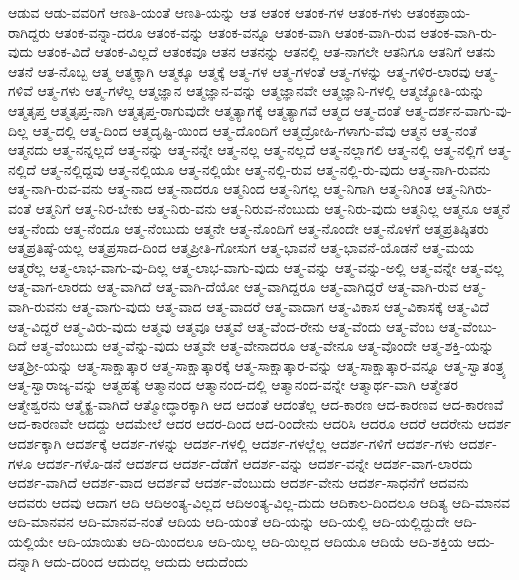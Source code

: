 {ಆಡುವ
ಆಡು-ವವರಿಗೆ
ಆಣತಿ-ಯಂತೆ
ಆಣತಿ-ಯನ್ನು
ಆತ
ಆತಂಕ
ಆತಂಕ-ಗಳ
ಆತಂಕ-ಗಳು
ಆತಂಕಪ್ರಾಯ-ರಾಗಿದ್ದರು
ಆತಂಕ-ವನ್ನಾ-ದರೂ
ಆತಂಕ-ವನ್ನು
ಆತಂಕ-ವನ್ನೂ
ಆತಂಕ-ವಾಗಿ
ಆತಂಕ-ವಾಗಿ-ರುವ
ಆತಂಕ-ವಾಗಿ-ರು-ವುದು
ಆತಂಕ-ವಿದೆ
ಆತಂಕ-ವಿಲ್ಲದೆ
ಆತಂಕವೂ
ಆತನ
ಆತನನ್ನು
ಆತನಲ್ಲಿ
ಆತ-ನಾಗಲೇ
ಆತನಿಗೂ
ಆತನಿಗೆ
ಆತನು
ಆತನೆ
ಆತ-ನೊಬ್ಬ
ಆತ್ಮ
ಆತ್ಮಕ್ಕಾಗಿ
ಆತ್ಮಕ್ಕೂ
ಆತ್ಮಕ್ಕೆ
ಆತ್ಮ-ಗಳ
ಆತ್ಮ-ಗಳಂತೆ
ಆತ್ಮ-ಗಳನ್ನು
ಆತ್ಮ-ಗಳಿರ-ಲಾರವು
ಆತ್ಮ-ಗಳಿವೆ
ಆತ್ಮ-ಗಳು
ಆತ್ಮ-ಗಳೆಲ್ಲ
ಆತ್ಮಜ್ಞಾನ
ಆತ್ಮಜ್ಞಾನ-ವನ್ನು
ಆತ್ಮಜ್ಞಾನವೇ
ಆತ್ಮಜ್ಞಾನಿ-ಗಳಲ್ಲಿ
ಆತ್ಮಜ್ಯೋತಿ-ಯನ್ನು
ಆತ್ಮತೃಪ್ತ
ಆತ್ಮತೃಪ್ತ-ನಾಗಿ
ಆತ್ಮತೃಪ್ತ-ರಾಗುವುದೇ
ಆತ್ಮತ್ಯಾಗಕ್ಕೆ
ಆತ್ಮತ್ಯಾಗವೆ
ಆತ್ಮದ
ಆತ್ಮ-ದಂತೆ
ಆತ್ಮ-ದರ್ಶನ-ವಾಗು-ವು-ದಿಲ್ಲ
ಆತ್ಮ-ದಲ್ಲಿ
ಆತ್ಮ-ದಿಂದ
ಆತ್ಮದೃಷ್ಟಿ-ಯಿಂದ
ಆತ್ಮ-ದೊಂದಿಗೆ
ಆತ್ಮದ್ರೋಹಿ-ಗಳಾಗು-ವೆವು
ಆತ್ಮನ
ಆತ್ಮ-ನಂತೆ
ಆತ್ಮನದು
ಆತ್ಮ-ನನ್ನಲ್ಲದೆ
ಆತ್ಮ-ನನ್ನು
ಆತ್ಮ-ನನ್ನೇ
ಆತ್ಮ-ನಲ್ಲ
ಆತ್ಮ-ನಲ್ಲದೆ
ಆತ್ಮ-ನಲ್ಲಾಗಲಿ
ಆತ್ಮ-ನಲ್ಲಿ
ಆತ್ಮ-ನಲ್ಲಿಗೆ
ಆತ್ಮ-ನಲ್ಲಿದೆ
ಆತ್ಮ-ನಲ್ಲಿದ್ದವು
ಆತ್ಮ-ನಲ್ಲಿಯೂ
ಆತ್ಮ-ನಲ್ಲಿಯೇ
ಆತ್ಮ-ನಲ್ಲಿ-ರುವ
ಆತ್ಮ-ನಲ್ಲಿ-ರು-ವುದು
ಆತ್ಮ-ನಾಗಿ-ರುವನು
ಆತ್ಮ-ನಾಗಿ-ರುವ-ವನು
ಆತ್ಮ-ನಾದ
ಆತ್ಮ-ನಾದರೂ
ಆತ್ಮನಿಂದ
ಆತ್ಮ-ನಿಗಲ್ಲ
ಆತ್ಮ-ನಿಗಾಗಿ
ಆತ್ಮ-ನಿಗಿಂತ
ಆತ್ಮ-ನಿಗಿರು-ವಂತೆ
ಆತ್ಮನಿಗೆ
ಆತ್ಮ-ನಿರ-ಬೇಕು
ಆತ್ಮ-ನಿರು-ವನು
ಆತ್ಮ-ನಿರುವ-ನೆಂಬುದು
ಆತ್ಮ-ನಿರು-ವುದು
ಆತ್ಮನಿಲ್ಲ
ಆತ್ಮನೂ
ಆತ್ಮನೆ
ಆತ್ಮ-ನೆಂದು
ಆತ್ಮ-ನೆಂದೂ
ಆತ್ಮ-ನೆಂಬುದು
ಆತ್ಮನೇ
ಆತ್ಮ-ನೊಂದಿಗೆ
ಆತ್ಮ-ನೊಂದೇ
ಆತ್ಮ-ನೊಳಗೆ
ಆತ್ಮಪ್ರತಿಷ್ಠಿತರು
ಆತ್ಮಪ್ರತಿಷ್ಠೆ-ಯಲ್ಲ
ಆತ್ಮಪ್ರಸಾದ-ದಿಂದ
ಆತ್ಮಪ್ರೀತಿ-ಗೋಸುಗ
ಆತ್ಮ-ಭಾವನೆ
ಆತ್ಮ-ಭಾವನೆ-ಯೊಡನೆ
ಆತ್ಮ-ಮಯ
ಆತ್ಮರೆಲ್ಲ
ಆತ್ಮ-ಲಾಭ-ವಾಗು-ವು-ದಿಲ್ಲ
ಆತ್ಮ-ಲಾಭ-ವಾಗು-ವುದು
ಆತ್ಮ-ವನ್ನು
ಆತ್ಮ-ವನ್ನು-ಅಲ್ಲಿ
ಆತ್ಮ-ವನ್ನೇ
ಆತ್ಮ-ವಲ್ಲ
ಆತ್ಮ-ವಾಗ-ಲಾರದು
ಆತ್ಮ-ವಾಗಿದೆ
ಆತ್ಮ-ವಾಗಿ-ದೆಯೋ
ಆತ್ಮ-ವಾಗಿದ್ದರೂ
ಆತ್ಮ-ವಾಗಿದ್ದರೆ
ಆತ್ಮ-ವಾಗಿ-ರುವ
ಆತ್ಮ-ವಾಗಿ-ರುವನು
ಆತ್ಮ-ವಾಗು-ವುದು
ಆತ್ಮ-ವಾದ
ಆತ್ಮ-ವಾದರೆ
ಆತ್ಮ-ವಾದಾಗ
ಆತ್ಮ-ವಿಕಾಸ
ಆತ್ಮ-ವಿಕಾಸಕ್ಕೆ
ಆತ್ಮ-ವಿದೆ
ಆತ್ಮ-ವಿದ್ದರೆ
ಆತ್ಮ-ವಿರು-ವುದು
ಆತ್ಮವು
ಆತ್ಮವೂ
ಆತ್ಮವೆ
ಆತ್ಮ-ವೆಂದ-ರೇನು
ಆತ್ಮ-ವೆಂದು
ಆತ್ಮ-ವೆಂಬ
ಆತ್ಮ-ವೆಂಬು-ದಿದೆ
ಆತ್ಮ-ವೆಂಬುದು
ಆತ್ಮ-ವೆನ್ನು-ವುದು
ಆತ್ಮವೇ
ಆತ್ಮ-ವೇನಾದರೂ
ಆತ್ಮ-ವೇನೂ
ಆತ್ಮ-ವೊಂದೇ
ಆತ್ಮ-ಶಕ್ತಿ-ಯನ್ನು
ಆತ್ಮಶ್ರೀ-ಯನ್ನು
ಆತ್ಮ-ಸಾಕ್ಷಾತ್ಕಾರ
ಆತ್ಮ-ಸಾಕ್ಷಾತ್ಕಾರಕ್ಕೆ
ಆತ್ಮ-ಸಾಕ್ಷಾತ್ಕಾರ-ವನ್ನು
ಆತ್ಮ-ಸಾಕ್ಷಾತ್ಕಾರ-ವನ್ನೂ
ಆತ್ಮ-ಸ್ವಾತಂತ್ರ್ಯ
ಆತ್ಮ-ಸ್ವಾರಾಜ್ಯ-ವನ್ನು
ಆತ್ಮಹತ್ಯೆ
ಆತ್ಮಾನಂದ
ಆತ್ಮಾನಂದ-ದಲ್ಲಿ
ಆತ್ಮಾನಂದ-ವನ್ನೇ
ಆತ್ಮಾರ್ಥ-ವಾಗಿ
ಆತ್ಮೇತರ
ಆತ್ಮೇಶ್ವರನು
ಆತ್ಮೈಕ್ಯ-ವಾಗಿದೆ
ಆತ್ಮೋದ್ಧಾರಕ್ಕಾಗಿ
ಆದ
ಆದಂತೆ
ಆದಂತೆಲ್ಲ
ಆದ-ಕಾರಣ
ಆದ-ಕಾರಣವ
ಆದ-ಕಾರಣವೆ
ಆದ-ಕಾರಣವೇ
ಆದದ್ದು
ಆದಮೇಲೆ
ಆದರ
ಆದರ-ದಿಂದ
ಆದ-ರಿಂದೇನು
ಆದರಿಸಿ
ಆದರೂ
ಆದರೆ
ಆದರೇನು
ಆದರ್ಶ
ಆದರ್ಶಕ್ಕಾಗಿ
ಆದರ್ಶಕ್ಕೆ
ಆದರ್ಶ-ಗಳನ್ನು
ಆದರ್ಶ-ಗಳಲ್ಲಿ
ಆದರ್ಶ-ಗಳಲ್ಲೆಲ್ಲ
ಆದರ್ಶ-ಗಳಿಗೆ
ಆದರ್ಶ-ಗಳು
ಆದರ್ಶ-ಗಳೂ
ಆದರ್ಶ-ಗಳೊ-ಡನೆ
ಆದರ್ಶದ
ಆದರ್ಶ-ದೆಡೆಗೆ
ಆದರ್ಶ-ವನ್ನು
ಆದರ್ಶ-ವನ್ನೇ
ಆದರ್ಶ-ವಾಗ-ಲಾರದು
ಆದರ್ಶ-ವಾಗಿದೆ
ಆದರ್ಶ-ವಾದ
ಆದರ್ಶವೆ
ಆದರ್ಶ-ವೆಂಬುದು
ಆದರ್ಶ-ವೇನು
ಆದರ್ಶ-ಸಾಧನೆಗೆ
ಆದವನು
ಆದವರು
ಆದವು
ಆದಾಗ
ಆದಿ
ಆದಿಅಂತ್ಯ-ವಿಲ್ಲದ
ಆದಿಅಂತ್ಯ-ವಿಲ್ಲ-ದುದು
ಆದಿಕಾಲ-ದಿಂದಲೂ
ಆದಿತ್ಯ
ಆದಿ-ಮಾನವ
ಆದಿ-ಮಾನವನ
ಆದಿ-ಮಾನವ-ನಂತೆ
ಆದಿಯ
ಆದಿ-ಯಂತೆ
ಆದಿ-ಯನ್ನು
ಆದಿ-ಯಲ್ಲಿ
ಆದಿ-ಯಲ್ಲಿದ್ದುದೇ
ಆದಿ-ಯಲ್ಲಿಯೇ
ಆದಿ-ಯಾಯಿತು
ಆದಿ-ಯಿಂದಲೂ
ಆದಿ-ಯಿಲ್ಲ
ಆದಿ-ಯಿಲ್ಲದ
ಆದಿಯೂ
ಆದಿಯೆ
ಆದಿ-ಶಕ್ತಿಯ
ಆದು-ದನ್ನಾಗಿ
ಆದು-ದರಿಂದ
ಆದುದಲ್ಲ
ಆದುದು
ಆದುದೆಂದು
}

